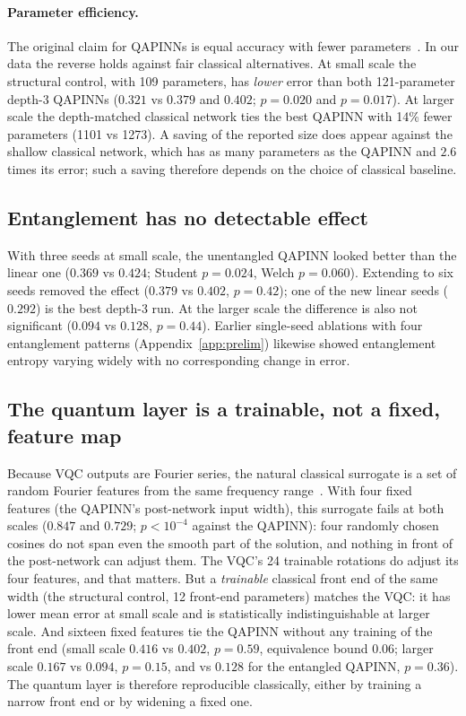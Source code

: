 \documentclass[11pt]{article}
\begin{document}
\paragraph{Parameter efficiency.} The original claim for QAPINNs is equal accuracy with
fewer parameters~\cite{qapinn}. In our data the reverse holds against fair classical
alternatives. At small scale the structural control, with 109 parameters, has
\emph{lower} error than both 121-parameter depth-3 QAPINNs ($0.321$ vs $0.379$ and
$0.402$; $p=0.020$ and $p=0.017$). At larger scale the depth-matched classical network
ties the best QAPINN with 14\% fewer parameters (1101 vs 1273). A saving of the reported
size does appear against the shallow classical network, which has as many parameters as
the QAPINN and $2.6$ times its error; such a saving therefore depends on the choice of
classical baseline.

\subsection{Entanglement has no detectable effect}\label{sec:ent}
With three seeds at small scale, the unentangled QAPINN looked better than the linear
one ($0.369$ vs $0.424$; Student $p=0.024$, Welch $p=0.060$). Extending to six seeds
removed the effect ($0.379$ vs $0.402$, $p=0.42$); one of the new linear seeds
($0.292$) is the best depth-3 run. At the larger scale the difference is also not
significant ($0.094$ vs $0.128$, $p=0.44$). Earlier single-seed ablations with four
entanglement patterns (Appendix~\ref{app:prelim}) likewise showed entanglement entropy
varying widely with no corresponding change in error.

\subsection{The quantum layer is a trainable, not a fixed, feature map}\label{sec:rff}
Because VQC outputs are Fourier series, the natural classical surrogate is a set of
random Fourier features from the same frequency range~\cite{landman,sweke}. With four
fixed features (the QAPINN's post-network input width), this surrogate fails at both
scales ($0.847$ and $0.729$; $p<10^{-4}$ against the QAPINN): four randomly chosen
cosines do not span even the smooth part of the solution, and nothing in front of the
post-network can adjust them. The VQC's 24 trainable rotations do adjust its four
features, and that matters. But a \emph{trainable} classical front end of the same
width (the structural control, 12 front-end parameters) matches the VQC: it has lower
mean error at small scale and is statistically indistinguishable at larger scale. And sixteen fixed features tie the QAPINN without any training of
the front end (small scale $0.416$ vs $0.402$, $p=0.59$, equivalence bound $0.06$; larger scale $0.167$ vs
$0.094$, $p=0.15$, and vs $0.128$ for the entangled QAPINN, $p=0.36$). The quantum
layer is therefore reproducible classically, either by training a narrow front end or
by widening a fixed one.
\end{document}
